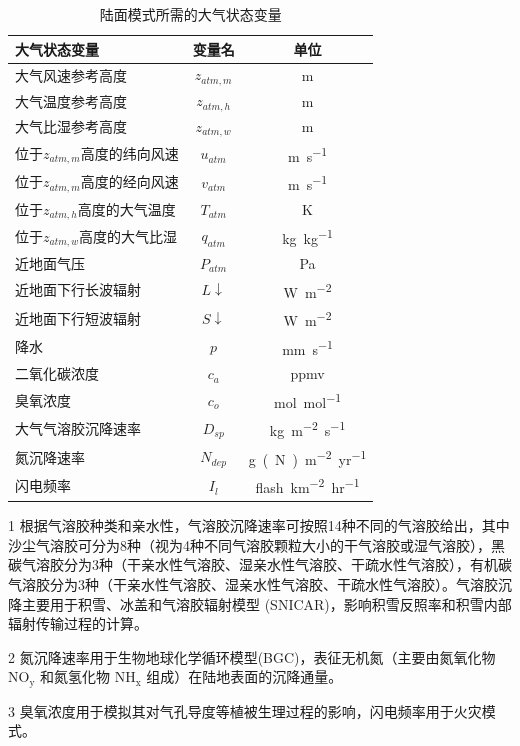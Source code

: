 {
\begin{table}[htbp]
\centering
\caption{陆面模式所需的大气状态变量}
\label{tab:陆面模式所需的大气状态变量}
\begin{threeparttable}
\begin{tabular}{lcc}
\toprule
大气状态变量               & 变量名           & 单位           \\  \midrule
大气风速参考高度             & $z_{atm,m}$   & m            \\
大气温度参考高度             & $z_{atm,h}$   & m            \\
大气比湿参考高度             & $z_{atm,w}$   & m            \\
位于$z_{atm,m}$高度的纬向风速 & $u_{atm}$     & \unit{m.s^{-1}}   \\
位于$z_{atm,m}$高度的经向风速 & $v_{atm}$     & \unit{m.s^{-1}}   \\
位于$z_{atm,h}$高度的大气温度 & $T_{atm}$     & K            \\
位于$z_{atm,w}$高度的大气比湿 & $q_{atm}$     & \unit{kg.kg^{-1}} \\
近地面气压                & $P_{atm}$     & Pa           \\
近地面下行长波辐射            & $L\downarrow$ & \unit{W.m^{-2}}   \\
近地面下行短波辐射            & $S\downarrow$ & \unit{W.m^{-2}}   \\
降水                   & $p$           & \unit{mm.s^{-1}}      \\
二氧化碳浓度               & $c_a$         & ppmv         \\
臭氧浓度                 & $c_o$         & \unit{mol.mol^{-1}}  \\
大气气溶胶沉降速率        & $D_{sp}$      & \unit{kg.m^{-2}.s^{-1}}  \\
氮沉降速率                & $N_{dep}$     & \unit{g(N).m^{-2}.yr^{-1}}   \\
闪电频率                 & $I_l$         & \unit{flash.km^{-2}.hr^{-1}} \\ \bottomrule    
\end{tabular}
\begin{tablenotes}
\footnotesize
\item[1] 根据气溶胶种类和亲水性，气溶胶沉降速率可按照14种不同的气溶胶给出，其中沙尘气溶胶可分为8种（视为4种不同气溶胶颗粒大小的干气溶胶或湿气溶胶），黑碳气溶胶分为3种（干亲水性气溶胶、湿亲水性气溶胶、干疏水性气溶胶），有机碳气溶胶分为3种（干亲水性气溶胶、湿亲水性气溶胶、干疏水性气溶胶）。气溶胶沉降主要用于积雪、冰盖和气溶胶辐射模型 (SNICAR)，影响积雪反照率和积雪内部辐射传输过程的计算。 
\item[2] 氮沉降速率用于生物地球化学循环模型(BGC)，表征无机氮（主要由氮氧化物 $\mathrm{NO_y}$ 和氮氢化物 $\mathrm{NH_x}$ 组成）在陆地表面的沉降通量。
\item[3] 臭氧浓度用于模拟其对气孔导度等植被生理过程的影响，闪电频率用于火灾模式。
\end{tablenotes}
\end{threeparttable}
\end{table}
}

